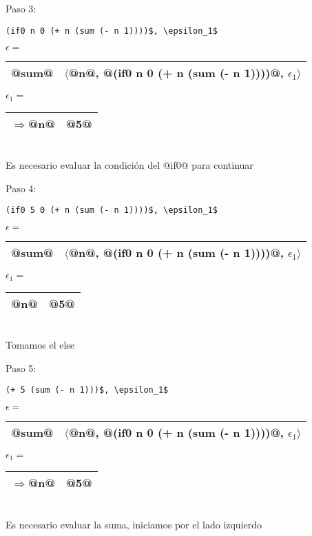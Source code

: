 \documentclass{article}
\begin{document}
\begin{enumerate}
\begin{itemize}
          Paso 3:
          \begin{lstlisting}
(if0 n 0 (+ n (sum (- n 1))))$, \epsilon_1$
          \end{lstlisting}
          $\epsilon = $ \begin{tabular}{|c|c|}
            @sum@ & $\langle$@n@, @(if0 n 0 (+ n (sum (- n 1))))@, $\epsilon_1\rangle$\\
            \hline
          \end{tabular}
          \hspace{0.5cm} $\epsilon_1 = $ \begin{tabular}{|c|c|}
             $\Rightarrow$@n@ & @5@ \\
            \hline
          \end{tabular}\\
          Es necesario evaluar la condición del @if0@ para continuar

          Paso 4:
          \begin{lstlisting}
(if0 5 0 (+ n (sum (- n 1))))$, \epsilon_1$
          \end{lstlisting}
          $\epsilon = $ \begin{tabular}{|c|c|}
            @sum@ & $\langle$@n@, @(if0 n 0 (+ n (sum (- n 1))))@, $\epsilon_1\rangle$\\
            \hline
          \end{tabular}
          \hspace{0.5cm} $\epsilon_1 = $ \begin{tabular}{|c|c|}
             @n@ & @5@ \\
            \hline
          \end{tabular}\\
          Tomamos el else

          Paso 5:
          \begin{lstlisting}
(+ 5 (sum (- n 1)))$, \epsilon_1$
          \end{lstlisting}
          $\epsilon = $ \begin{tabular}{|c|c|}
            @sum@ & $\langle$@n@, @(if0 n 0 (+ n (sum (- n 1))))@, $\epsilon_1\rangle$\\
            \hline
          \end{tabular}
          \hspace{0.5cm} $\epsilon_1 = $ \begin{tabular}{|c|c|}
             $\Rightarrow$@n@ & @5@ \\
            \hline
          \end{tabular}\\
          Es necesario evaluar la suma, iniciamos por el lado izquierdo


\end{itemize}
\end{enumerate}
\end{document}
